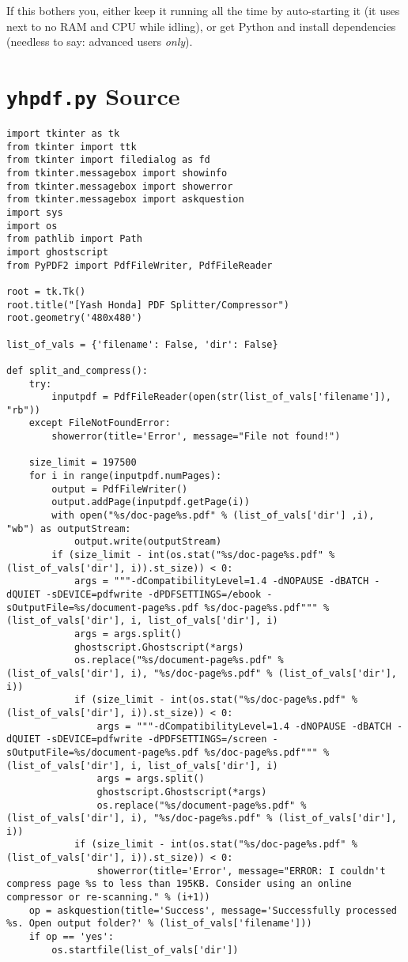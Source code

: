 \documentclass[9pt]{report}
\begin{document}
If this bothers you, either keep it running all the time by
auto-starting it (it uses next to no RAM and CPU while idling), or
get Python and install dependencies (needless to say: advanced
users \emph{only}).

\chapter{\texttt{yhpdf.py} Source}
\label{sec:org81374a5}

\begin{verbatim}
import tkinter as tk
from tkinter import ttk
from tkinter import filedialog as fd
from tkinter.messagebox import showinfo
from tkinter.messagebox import showerror
from tkinter.messagebox import askquestion
import sys
import os
from pathlib import Path
import ghostscript
from PyPDF2 import PdfFileWriter, PdfFileReader

root = tk.Tk()
root.title("[Yash Honda] PDF Splitter/Compressor")
root.geometry('480x480')

list_of_vals = {'filename': False, 'dir': False}

def split_and_compress():
    try:
        inputpdf = PdfFileReader(open(str(list_of_vals['filename']), "rb"))
    except FileNotFoundError:
        showerror(title='Error', message="File not found!")

    size_limit = 197500
    for i in range(inputpdf.numPages):
        output = PdfFileWriter()
        output.addPage(inputpdf.getPage(i))
        with open("%s/doc-page%s.pdf" % (list_of_vals['dir'] ,i), "wb") as outputStream:
            output.write(outputStream)
        if (size_limit - int(os.stat("%s/doc-page%s.pdf" % (list_of_vals['dir'], i)).st_size)) < 0:
            args = """-dCompatibilityLevel=1.4 -dNOPAUSE -dBATCH -dQUIET -sDEVICE=pdfwrite -dPDFSETTINGS=/ebook -sOutputFile=%s/document-page%s.pdf %s/doc-page%s.pdf""" % (list_of_vals['dir'], i, list_of_vals['dir'], i)
            args = args.split()
            ghostscript.Ghostscript(*args)
            os.replace("%s/document-page%s.pdf" % (list_of_vals['dir'], i), "%s/doc-page%s.pdf" % (list_of_vals['dir'], i))
            if (size_limit - int(os.stat("%s/doc-page%s.pdf" % (list_of_vals['dir'], i)).st_size)) < 0:
                args = """-dCompatibilityLevel=1.4 -dNOPAUSE -dBATCH -dQUIET -sDEVICE=pdfwrite -dPDFSETTINGS=/screen -sOutputFile=%s/document-page%s.pdf %s/doc-page%s.pdf""" % (list_of_vals['dir'], i, list_of_vals['dir'], i)
                args = args.split()
                ghostscript.Ghostscript(*args)
                os.replace("%s/document-page%s.pdf" % (list_of_vals['dir'], i), "%s/doc-page%s.pdf" % (list_of_vals['dir'], i))
            if (size_limit - int(os.stat("%s/doc-page%s.pdf" % (list_of_vals['dir'], i)).st_size)) < 0:
                showerror(title='Error', message="ERROR: I couldn't compress page %s to less than 195KB. Consider using an online compressor or re-scanning." % (i+1))
    op = askquestion(title='Success', message='Successfully processed %s. Open output folder?' % (list_of_vals['filename']))
    if op == 'yes':
        os.startfile(list_of_vals['dir'])


\end{verbatim}
\end{document}
